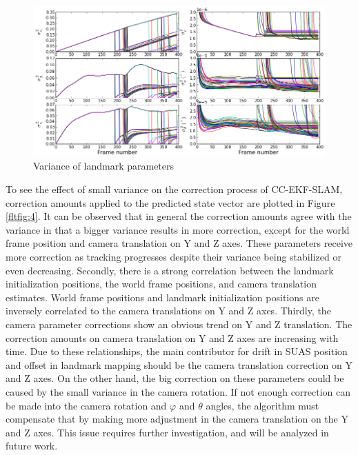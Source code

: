 \begin{figure}[h]
\centering
\includegraphics[width=14cm, keepaspectratio=true]
{./Figures/fltfig/cut1/Figure40.png}
\caption{Variance of landmark parameters}
\label{fltfig:3}
\end{figure}
\FloatBarrier

To see the effect of small variance on the correction process of
CC-EKF-SLAM, correction amounts applied to the predicted state vector
are plotted in Figure \ref{fltfig:4}. It can be observed that in
general the correction amounts agree with the variance in that a
bigger variance results in more correction, except for the world frame
position and camera translation on Y and Z axes. These parameters
receive more correction as tracking progresses despite their variance
being stabilized or even decreasing. Secondly, there is a strong
correlation between the landmark initialization positions, the world
frame positions, and camera translation estimates. World frame
positions and landmark initialization positions are inversely
correlated to the camera translations on Y and Z axes. Thirdly, the
camera parameter corrections show an obvious trend on Y and Z
translation. The correction amounts on camera translation on Y and Z axes
are increasing with time. Due to these relationships, the main
contributor for drift in SUAS position and offset in landmark mapping
should be the camera translation correction on Y and Z axes. On the
other hand, the big correction on these parameters could be caused by
the small variance in the camera rotation. If not enough correction
can be made into the camera rotation and $\varphi$ and $\theta$
angles, the algorithm must compensate that by making more adjustment
in the camera translation on the Y and Z axes. This issue requires
further investigation, and will be analyzed in future work.

